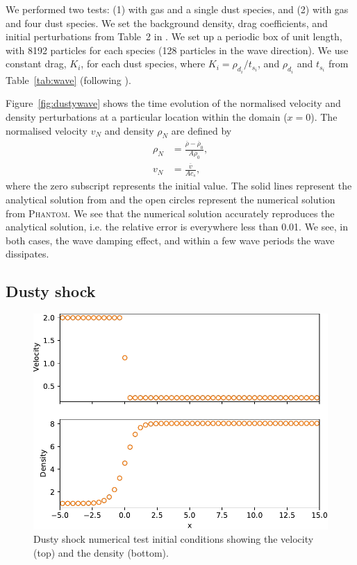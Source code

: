 \documentclass[fleqn,usenatbib]{mnras}
\begin{document}
We performed two tests: (1) with gas and a single dust species, and (2) with gas
and four dust species. We set the background density, drag coefficients, and
initial perturbations from Table~2 in
\citet{Benitez-Llambay2019ApJS..241...25B}. We set up a periodic box of unit
length, with 8192 particles for each species (128 particles in the wave
direction). We use constant drag, \(K_i\), for each dust species, where \(K_i =
\rho_{d_i} / t_{s_i}\), and \(\rho_{d_i}\) and \(t_{s_i}\) from
Table~\ref{tab:wave} (following \citet{Benitez-Llambay2019ApJS..241...25B}).

Figure~\ref{fig:dustywave} shows the time evolution of the normalised velocity
and density perturbations at a particular location within the domain (\(x=0\)).
The normalised velocity \( v_N \) and density \( \rho_N \) are defined by
%
\begin{align}
   \rho_N &= \frac{\overline{\rho} - \overline{\rho}_0}{A \overline{\rho}_0}, \\
   v_N &= \frac{\overline{v}}{A c_s},
\end{align}
%
where the zero subscript represents the initial value. The solid lines represent
the analytical solution from \citet{Benitez-Llambay2019ApJS..241...25B} and the
open circles represent the numerical solution from \textsc{Phantom}. We see that
the numerical solution accurately reproduces the analytical solution, i.e. the
relative error is everywhere less than 0.01. We see, in both cases, the wave
damping effect, and within a few wave periods the wave dissipates.

\subsection{Dusty shock}%
\label{subsec:shock}

\begin{figure}
   \begin{center}
      \includegraphics[width=\columnwidth]{figs/dustyshock_initial.pdf}
      \caption{Dusty shock numerical test initial conditions showing the
         velocity (top) and the density (bottom).\label{fig:dustyshock_initial}}
   \end{center}
\end{figure}
\end{document}
